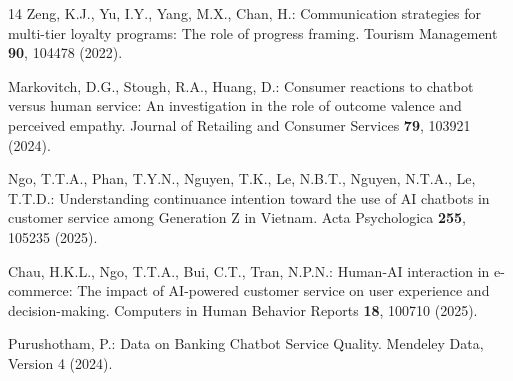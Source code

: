 \documentclass[runningheads]{llncs}
\begin{document}
\begin{thebibliography}{14}
Zeng, K.J., Yu, I.Y., Yang, M.X., Chan, H.: Communication strategies for multi-tier loyalty programs: The role of progress framing. Tourism Management \textbf{90}, 104478 (2022). 

Markovitch, D.G., Stough, R.A., Huang, D.: Consumer reactions to chatbot versus human service: An investigation in the role of outcome valence and perceived empathy. Journal of Retailing and Consumer Services \textbf{79}, 103921 (2024). 

Ngo, T.T.A., Phan, T.Y.N., Nguyen, T.K., Le, N.B.T., Nguyen, N.T.A., Le, T.T.D.: Understanding continuance intention toward the use of AI chatbots in customer service among Generation Z in Vietnam. Acta Psychologica \textbf{255}, 105235 (2025). 

Chau, H.K.L., Ngo, T.T.A., Bui, C.T., Tran, N.P.N.: Human-AI interaction in e-commerce: The impact of AI-powered customer service on user experience and decision-making. Computers in Human Behavior Reports \textbf{18}, 100710 (2025). 

Purushotham, P.: Data on Banking Chatbot Service Quality. Mendeley Data, Version 4 (2024). 
\end{thebibliography}
\end{document}
